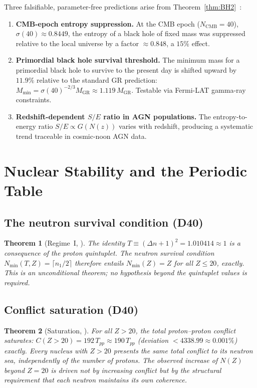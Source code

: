 \documentclass[11pt,a4paper]{article}
\theoremstyle{plain}
\newtheorem{theorem}{Theorem}[section]
\theoremstyle{definition}
\theoremstyle{remark}
\newcommand{\Tpp}{T_{pp}}
\begin{document}
Three falsifiable, parameter-free predictions arise from Theorem~\ref{thm:BH2}~\cite{D38}:
\begin{enumerate}
\item \textbf{CMB-epoch entropy suppression.} At the CMB epoch ($N_{\mathrm{CMB}}=40$), $\sigma(40)\approx 0.8449$, the entropy of a black hole of fixed mass was suppressed relative to the local universe by a factor $\approx 0.848$, a $15\%$ effect.
\item \textbf{Primordial black hole survival threshold.} The minimum mass for a primordial black hole to survive to the present day is shifted upward by $11.9\%$ relative to the standard GR prediction: $M_{\min}=\sigma(40)^{-2/3}M_{\mathrm{GR}}\approx 1.119\,M_{\mathrm{GR}}$. Testable via Fermi-LAT gamma-ray constraints.
\item \textbf{Redshift-dependent $S/E$ ratio in AGN populations.} The entropy-to-energy ratio $S/E\propto G(N(z))$ varies with redshift, producing a systematic trend traceable in cosmic-noon AGN data.
\end{enumerate}

\section{Nuclear Stability and the Periodic Table}
\label{sec:nuclear}

\subsection{The neutron survival condition (D40)}
\label{subsec:neutronsurvival}
\begin{theorem}[Regime~I, \cite{D40}]
\label{thm:NminI}
The identity $T\equiv(\Delta n+1)^2=1.010414\approx 1$ is a consequence of the proton quintuplet. The neutron survival condition $N_{\min}(T,Z)=\lceil n_1/2\rceil$ therefore entails $N_{\min}(Z)=Z$ for all $Z\leq 20$, exactly. This is an unconditional theorem; no hypothesis beyond the quintuplet values is required.
\end{theorem}

\subsection{Conflict saturation (D40)}
\label{subsec:conflictsat}
\begin{theorem}[Saturation, \cite{D40}]
\label{thm:saturation}
For all $Z>20$, the total proton--proton conflict saturates: $C(Z>20)=192\,\Tpp\approx 190\,\Tpp$ (deviation $<4338.99\approx 0.001\%$) exactly. Every nucleus with $Z>20$ presents the same total conflict to its neutron sea, independently of the number of protons. The observed increase of $N(Z)$ beyond $Z=20$ is driven not by increasing conflict but by the structural requirement that each neutron maintains its own coherence.
\end{theorem}
\end{document}
